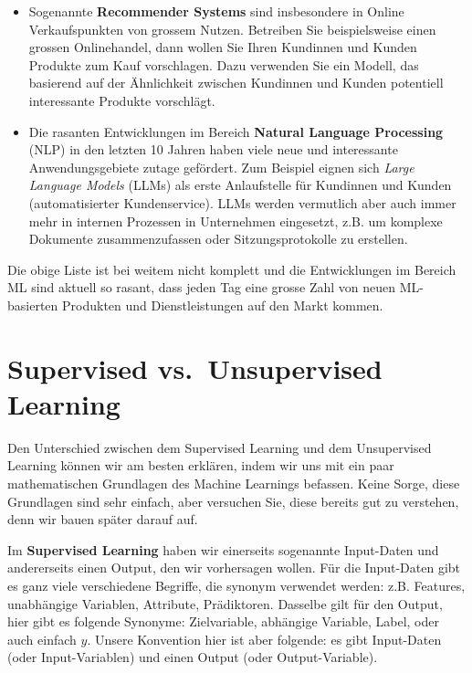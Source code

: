 \documentclass[
]{book}
\begin{document}
\begin{itemize}
\item
  Sogenannte \textbf{Recommender Systems} sind insbesondere in Online Verkaufspunkten von grossem Nutzen. Betreiben Sie beispielsweise einen grossen Onlinehandel, dann wollen Sie Ihren Kundinnen und Kunden Produkte zum Kauf vorschlagen. Dazu verwenden Sie ein Modell, das basierend auf der Ähnlichkeit zwischen Kundinnen und Kunden potentiell interessante Produkte vorschlägt.
\item
  Die rasanten Entwicklungen im Bereich \textbf{Natural Language Processing} (NLP) in den letzten 10 Jahren haben viele neue und interessante Anwendungsgebiete zutage gefördert. Zum Beispiel eignen sich \emph{Large Language Models} (LLMs) als erste Anlaufstelle für Kundinnen und Kunden (automatisierter Kundenservice). LLMs werden vermutlich aber auch immer mehr in internen Prozessen in Unternehmen eingesetzt, z.B. um komplexe Dokumente zusammenzufassen oder Sitzungsprotokolle zu erstellen.
\end{itemize}

Die obige Liste ist bei weitem nicht komplett und die Entwicklungen im Bereich ML sind aktuell so rasant, dass jeden Tag eine grosse Zahl von neuen ML-basierten Produkten und Dienstleistungen auf den Markt kommen.

\hypertarget{supervised-vs.-unsupervised-learning}{%
\section{Supervised vs.~Unsupervised Learning}\label{supervised-vs.-unsupervised-learning}}

Den Unterschied zwischen dem Supervised Learning und dem Unsupervised Learning können wir am besten erklären, indem wir uns mit ein paar mathematischen Grundlagen des Machine Learnings befassen. Keine Sorge, diese Grundlagen sind sehr einfach, aber versuchen Sie, diese bereits gut zu verstehen, denn wir bauen später darauf auf.

Im \textbf{Supervised Learning} haben wir einerseits sogenannte Input-Daten und andererseits einen Output, den wir vorhersagen wollen. Für die Input-Daten gibt es ganz viele verschiedene Begriffe, die synonym verwendet werden: z.B. Features, unabhängige Variablen, Attribute, Prädiktoren. Dasselbe gilt für den Output, hier gibt es folgende Synonyme: Zielvariable, abhängige Variable, Label, oder auch einfach \(y\). Unsere Konvention hier ist aber folgende: es gibt Input-Daten (oder Input-Variablen) und einen Output (oder Output-Variable).
\end{document}
